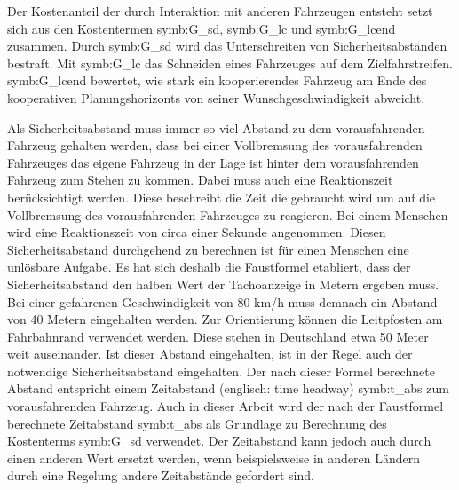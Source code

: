 Der Kostenanteil der durch Interaktion mit anderen Fahrzeugen entsteht setzt sich aus den Kostentermen \gls{symb:G_sd}, \gls{symb:G_lc} und \gls{symb:G_lcend} zusammen.
Durch \gls{symb:G_sd} wird das Unterschreiten von Sicherheitsabst\"anden bestraft.
Mit \gls{symb:G_lc} das Schneiden eines Fahrzeuges auf dem Zielfahrstreifen.
\gls{symb:G_lcend} bewertet, wie stark ein kooperierendes Fahrzeug am Ende des kooperativen Planungshorizonts von seiner Wunschgeschwindigkeit abweicht.

Als Sicherheitsabstand muss immer so viel Abstand zu dem vorausfahrenden Fahrzeug gehalten werden, dass bei einer Vollbremsung des vorausfahrenden Fahrzeuges das eigene Fahrzeug in der Lage ist hinter dem vorausfahrenden Fahrzeug zum Stehen zu kommen.
Dabei muss auch eine Reaktionszeit ber\"ucksichtigt werden.
Diese beschreibt die Zeit die gebraucht wird um auf die Vollbremsung des vorausfahrenden Fahrzeuges zu reagieren.
Bei einem Menschen wird eine Reaktionszeit von circa einer Sekunde angenommen.
Diesen Sicherheitsabstand durchgehend zu berechnen ist f\"ur einen Menschen eine unl\"osbare Aufgabe.
Es hat sich deshalb die Faustformel etabliert, dass der Sicherheitsabstand den halben Wert der Tachoanzeige in Metern ergeben muss.
Bei einer gefahrenen Geschwindigkeit von 80 km/h muss demnach ein Abstand von 40 Metern eingehalten werden.
Zur Orientierung k\"onnen die Leitpfosten am Fahrbahnrand verwendet werden.
Diese stehen in Deutschland etwa 50 Meter weit auseinander.
Ist dieser Abstand eingehalten, ist in der Regel auch der notwendige Sicherheitsabstand eingehalten.
Der nach dieser Formel berechnete Abstand entspricht einem Zeitabstand (englisch: time headway) \gls{symb:t_abs} zum vorausfahrenden Fahrzeug.
Auch in dieser Arbeit wird der nach der Faustformel berechnete Zeitabstand \gls{symb:t_abs} als Grundlage zu Berechnung des Kostenterms \gls{symb:G_sd} verwendet.
Der Zeitabstand kann jedoch auch durch einen anderen Wert ersetzt werden, wenn beispielsweise in anderen L\"andern durch eine Regelung andere Zeitabst\"ande gefordert sind.

